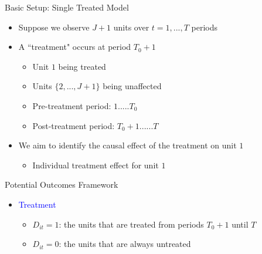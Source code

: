 \documentclass[hyperref={pdfpagelabels=false}]{beamer}
\begin{document}
\begin{frame}{Basic Setup: Single Treated Model}
\begin{itemize}
\item Suppose we observe $J+1$ units over $t=1,...,T$ periods
\vspace{0.2cm}
\item A ``treatment" occurs at period $T_0+1$
\vspace{0.2cm}
\begin{itemize}	
\item Unit $1$ being treated
\vspace{0.2cm}
\item Units $\{2,...,J+1\}$ being unaffected 
\vspace{0.2cm}
\item Pre-treatment period: $1.....T_0$	
\vspace{0.2cm}	
\item Post-treatment period: $T_0+1......T$	
\vspace{0.2cm} 
\end{itemize}

\item We aim to identify the causal effect of the treatment on unit $1$

\vspace{0.2cm} 
\begin{itemize}
\item Individual treatment effect for unit $1$
\end{itemize}
\end{itemize}

\end{frame}


\begin{frame}{Potential Outcomes Framework}{}
	\begin{itemize}
		
		\item \textcolor{blue}{Treatment}
		\begin{itemize}
			\vspace{0.2cm}
			\item $D_{it}=1$: the units that are treated from periods $T_0+1$ until $T$
			\vspace{0.2cm}
			\item $D_{it}=0$: the units that are always untreated
		\end{itemize}
		
	\end{itemize}
\end{frame}
\end{document}
